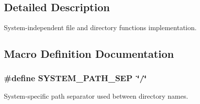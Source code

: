 \subsection{Detailed Description}
System-\/independent file and directory functions implementation. 

\subsection{Macro Definition Documentation}
\subsubsection[{\texorpdfstring{S\+Y\+S\+T\+E\+M\+\_\+\+P\+A\+T\+H\+\_\+\+S\+EP}{SYSTEM_PATH_SEP}}]{\setlength{\rightskip}{0pt plus 5cm}\#define S\+Y\+S\+T\+E\+M\+\_\+\+P\+A\+T\+H\+\_\+\+S\+EP~\char`\"{}/\char`\"{}}\hypertarget{system-path_8cc_ae6764c655849cd2f06e112ac5222a99c}{}\label{system-path_8cc_ae6764c655849cd2f06e112ac5222a99c}
System-\/specific path separator used between directory names. 